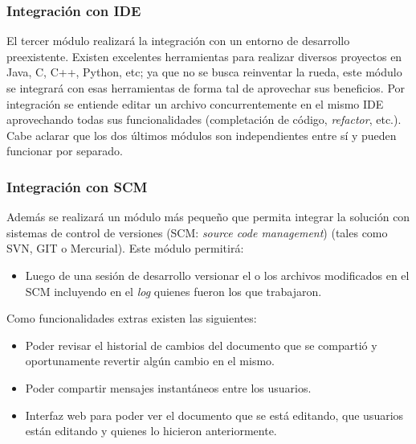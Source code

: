 \documentclass[a4paper,11pt]{article}
\begin{document}
				\subsubsection{Integraci\'on con IDE}
					El tercer m\'odulo realizar\'a la integraci\'on con un entorno de desarrollo
					preexistente. Existen excelentes herramientas para realizar diversos
					proyectos en Java, C, C++, Python, etc; ya que no se busca reinventar la rueda,
					este m\'odulo se integrar\'a con esas herramientas de forma tal de aprovechar sus
					beneficios. Por integraci\'on se entiende editar un archivo concurrentemente en
					el mismo IDE aprovechando todas sus funcionalidades (completaci\'on de c\'odigo,
					\textit{refactor}, etc.). \\

			Cabe aclarar que los dos \'ultimos m\'odulos son independientes entre s\'i y pueden
			funcionar por separado.

			\subsubsection{Integraci\'on con SCM}
				Adem\'as se realizar\'a un m\'odulo m\'as peque\~no que permita integrar la soluci\'on
				con sistemas de control de versiones (SCM: \textit{source code management}) (tales como
				SVN, GIT o Mercurial). Este m\'odulo permitir\'a:

				\begin{itemize}
					\item	Luego de una sesi\'on de desarrollo versionar el o los archivos modificados
							en el SCM incluyendo en el \textit{log} quienes fueron los que trabajaron.
				\end{itemize}

				Como funcionalidades extras existen las siguientes:

				\begin{itemize}
					\item	Poder revisar el historial de cambios del documento que se comparti\'o y
							oportunamente revertir alg\'un cambio en el mismo.
					\item 	Poder compartir mensajes instant\'aneos entre los usuarios.
					\item 	Interfaz web para poder ver el documento que se est\'a editando, que
							usuarios est\'an editando y quienes lo hicieron anteriormente.
				\end{itemize}
\end{document}
